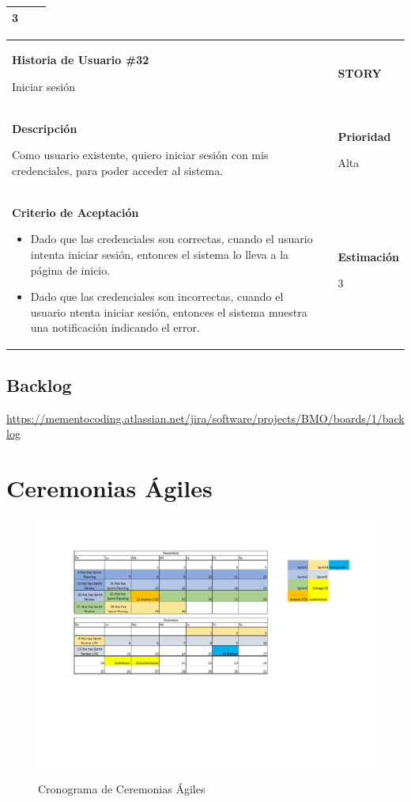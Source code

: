 \documentclass[12pt,a4paper]{article}
\begin{document}
\begin{center}
\begin{tabular}{| p{10cm} c p{2.5cm}|}
3 \\ 
\hline 
\end{tabular}
\vspace{5mm}

\begin{tabular}{| p{10cm} c p{2.5cm}|}
\hline 
\textbf{Historia de Usuario \#32}

Iniciar sesión & & \textbf{{\Large STORY}} \\ 
\textbf{Descripción}

Como usuario existente, quiero iniciar sesión con mis credenciales, para
poder acceder al sistema. &  & \textbf{Prioridad}

Alta\\

\textbf{Criterio de Aceptación}

\begin{itemize}
\item Dado que las credenciales son correctas, cuando el usuario
intenta iniciar sesión, entonces el sistema lo lleva a la página de
inicio.
\item Dado que las credenciales son incorrectas, cuando el usuario
ntenta iniciar sesión, entonces el sistema muestra una
notificación indicando el error.
\end{itemize} & & \textbf{Estimación}

3 \\ 
\hline 
\end{tabular}
\vspace{5mm}

\end{center}
\subsection{Backlog}
\url{https://mementocoding.atlassian.net/jira/software/projects/BMO/boards/1/backlog}
\section{Ceremonias Ágiles}
\begin{figure}[H]
\centering
{\includegraphics[width=1 \textwidth]{cronograma.pdf}\par}
\caption{Cronograma de Ceremonias Ágiles}
\end{figure}
\end{document}

